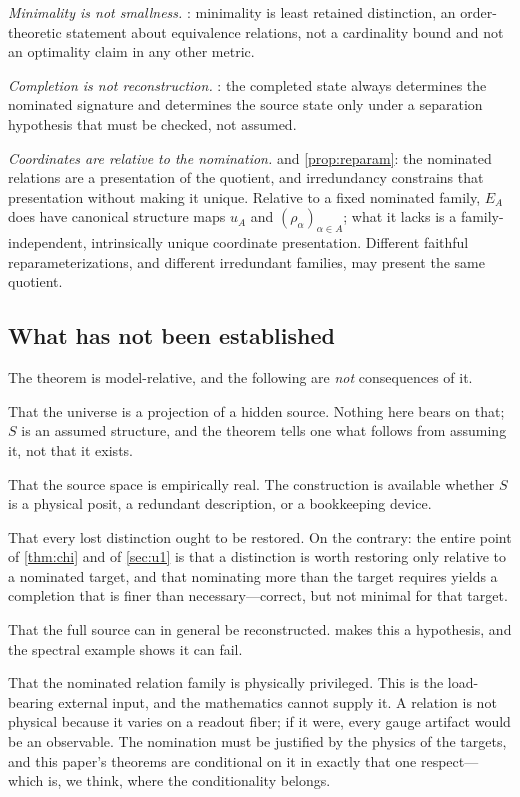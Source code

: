 \documentclass[11pt,reqno]{amsart}
\theoremstyle{plain}
\theoremstyle{definition}
\theoremstyle{remark}
\numberwithin{equation}{section}
\begin{document}
\emph{Minimality is not smallness.} : minimality is least retained distinction,
an order-theoretic statement about equivalence relations, not a cardinality bound and not an
optimality claim in any other metric.

\emph{Completion is not reconstruction.} : the completed state always
determines the nominated signature and determines the source state only under a separation hypothesis
that must be checked, not assumed.

\emph{Coordinates are relative to the nomination.}  and
\cref{prop:reparam}: the nominated relations are a presentation of the quotient, and irredundancy
constrains that presentation without making it unique. Relative to a fixed nominated family, $E_A$
does have canonical structure maps $u_A$ and $(\rho_\alpha)_{\alpha\in A}$; what it lacks is a
family-independent, intrinsically unique coordinate presentation. Different faithful
reparameterizations, and different irredundant families, may present the same quotient.

\subsection{What has not been established}

The theorem is model-relative, and the following are \emph{not} consequences of it.

That the universe is a projection of a hidden source. Nothing here bears on that; $S$ is an assumed
structure, and the theorem tells one what follows from assuming it, not that it exists.

That the source space is empirically real. The construction is available whether $S$ is a physical
posit, a redundant description, or a bookkeeping device.

That every lost distinction ought to be restored. On the contrary: the entire point of
\cref{thm:chi} and of \cref{sec:u1} is that a distinction is worth restoring only relative to a
nominated target, and that nominating more than the target requires yields a completion that is
finer than necessary---correct, but not minimal for that target.

That the full source can in general be reconstructed.  makes this a
hypothesis, and the spectral example shows it can fail.

That the nominated relation family is physically privileged. This is the load-bearing external input,
and the mathematics cannot supply it. A relation is not physical because it varies on a readout
fiber; if it were, every gauge artifact would be an observable. The nomination must be justified by
the physics of the targets, and this paper's theorems are conditional on it in exactly that one
respect---which is, we think, where the conditionality belongs.
\end{document}
